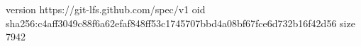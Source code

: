 version https://git-lfs.github.com/spec/v1
oid sha256:c4aff3049c88f6a62efaf848ff53c1745707bbd4a08bf67fce6d732b16f42d56
size 7942
